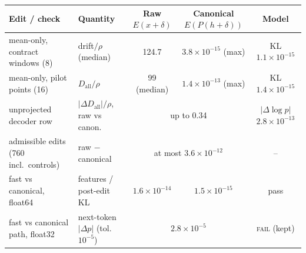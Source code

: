 \begin{tabular}{llccc}
\toprule
Edit / check & Quantity & Raw $E(x{+}\delta)$ & Canonical $E(P(h{+}\delta))$ & Model \\
\midrule
mean-only, contract windows (8) & drift$/\rho$ (median) & 124.7 & $3.8\times10^{-15}$ (max) & KL $1.1\times10^{-15}$ \\
mean-only, pilot points (16) & $D_{\mathrm{all}}/\rho$ & 99 (median) & $1.4\times10^{-13}$ (max) & KL $1.4\times10^{-15}$ \\
unprojected decoder row & $|\Delta D_{\mathrm{all}}|/\rho$, raw vs canon. & \multicolumn{2}{c}{up to 0.34} & $|\Delta\log p|$ $2.8\times10^{-13}$ \\
admissible edits (760 incl.\ controls) & raw $-$ canonical & \multicolumn{2}{c}{at most $3.6\times10^{-12}$} & -- \\
fast vs canonical, float64 & features / post-edit KL & $1.6\times10^{-14}$ & $1.5\times10^{-15}$ & pass \\
fast vs canonical path, float32 & next-token $|\Delta p|$ (tol.\ $10^{-5}$) & \multicolumn{2}{c}{$2.8\times10^{-5}$} & \textsc{fail} (kept) \\
\bottomrule
\end{tabular}
